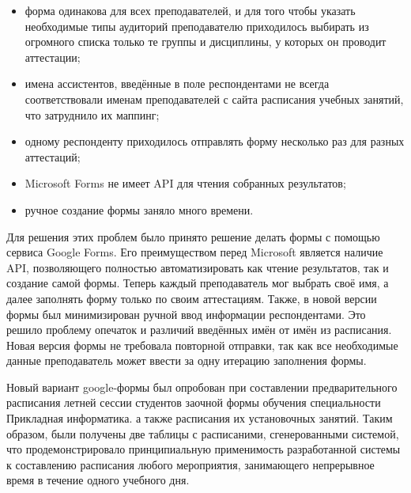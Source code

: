 \begin{itemize}
\item форма одинакова для всех преподавателей, и для того чтобы указать необходимые типы аудиторий преподавателю приходилось выбирать из огромного списка только те группы и дисциплины, у которых он проводит аттестации;
\item имена ассистентов, введённые в поле респондентами не всегда соответствовали именам преподавателей с сайта расписания учебных занятий, что затруднило их маппинг;
\item одному респонденту приходилось отправлять форму несколько раз для разных аттестаций;
\item Microsoft Forms не имеет API для чтения собранных результатов;
\item ручное создание формы заняло много времени.
\end{itemize} 	

Для решения этих проблем было принято решение делать формы с помощью сервиса Google Forms. Его преимуществом перед Microsoft является наличие API, позволяющего полностью автоматизировать как чтение результатов, так и создание самой формы. Теперь каждый преподаватель мог выбрать своё имя, а далее заполнять форму только по своим аттестациям. Также, в новой версии формы был минимизирован ручной ввод информации респондентами. Это решило проблему опечаток и различий введённых имён от имён из расписания. Новая версия формы не требовала повторной отправки, так как все необходимые данные преподаватель может ввести за одну итерацию заполнения формы.

Новый вариант google-формы был опробован при составлении предварительного расписания летней сессии студентов заочной формы обучения специальности Прикладная информатика. 
а также расписания их установочных занятий. Таким образом, были получены две таблицы с расписаними, сгенерованными системой, что продемонстрировало принципиальную применимость разработанной системы к составлению расписания любого мероприятия, занимающего непрерывное время в течение одного учебного дня. 

